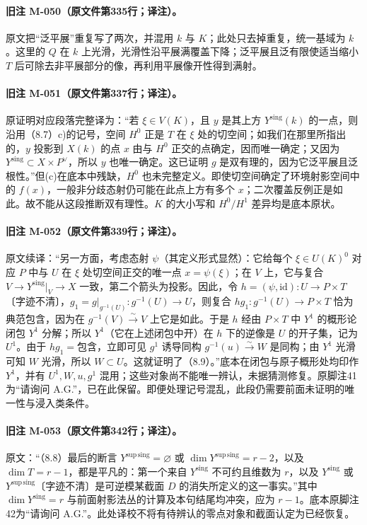 \documentclass[UTF8,a4paper]{ctexbook}
\begin{document}
\paragraph{旧注 M-050（原文件第335行；译注）。}
原文把“泛平展”重复写了两次，并混用 $k$ 与 $K$；此处只去掉重复，统一基域为 $k$。这里的 $Q$ 在 $k$ 上光滑，光滑性沿平展满覆盖下降；泛平展且泛有限使适当缩小 $T$ 后可除去非平展部分的像，再利用平展像开性得到满射。

\paragraph{旧注 M-051（原文件第337行；译注）。}
原证明对应段落完整译为：“若 $\xi\in V(K)$，且 $y$ 是其上方 ${Y^{\mathrm{sing}}}(k)$ 的一点，则沿用（8.7）c)的记号，空间 $H^0$ 正是 $T$ 在 $\xi$ 处的切空间；如我们在那里所指出的，$y$ 投影到 $X(k)$ 的点 $x$ 由与 $H^0$ 正交的点确定，因而唯一确定；又因为 ${Y^{\mathrm{sing}}}\subset X\times P^\vee$，所以 $y$ 也唯一确定。这已证明 $g$ 是双有理的，因为它泛平展且泛根性。”但(c)在底本中残缺，$H^0$ 也未完整定义。即使切空间确定了环境射影空间中的 $f(x)$，一般非分歧态射仍可能在此点上方有多个 $x$；二次覆盖反例正是如此。故不能从这段推断双有理性。$K$ 的大小写和 $H^0/H^1$ 差异均是底本原状。

\paragraph{旧注 M-052（原文件第339行；译注）。}
原文续译：“另一方面，考虑态射 $\psi$（其定义形式显然）：它给每个 $\xi\in U(K)^0$ 对应 $P$ 中与 $U$ 在 $\xi$ 处切空间正交的唯一点 $x=\psi(\xi)$；在 $V$ 上，它与复合 $V\to{Y^{\mathrm{sing}}}|_V\to X$ 一致，第二个箭头为投影。因此，令 $h=(\psi,\mathrm{id}):U\to P\times T$〔字迹不清〕，$g_1=g|_{g^{-1}(U)}:g^{-1}(U)\to U$，则复合 $hg_1:g^{-1}(U)\to P\times T$ 恰为典范包含，因为在 $g^{-1}(V)\xrightarrow{\sim}V$ 上它是如此。于是 $h$ 经由 $P\times T$ 中 $Y^1$ 的概形论闭包 $Y^1$ 分解；所以 $Y^1$（它在上述闭包中开）在 $h$ 下的逆像是 $U$ 的开子集，记为 $U^1$。由于 $hg_1=\text{包含}$，立即可见 $g^1$ 诱导同构 $g^{-1}(u)\xrightarrow{\sim}W$ 是同构；由 $Y^1$ 光滑可知 $W$ 光滑，所以 $W\subset U$。这就证明了（8.9）。”底本在闭包与原子概形处均印作 $Y^1$，并有 $U^1,W,u,g^1$ 混用；这些对象尚不能唯一辨认，未据猜测修复。原脚注41为“请询问 A.G.”，已在此保留。即便处理记号混乱，此段仍需要前面未证明的唯一性与浸入类条件。

\paragraph{旧注 M-053（原文件第342行；译注）。}
原文：“（8.8）最后的断言 ${Y^{\mathrm{sup\,sing}}}=\varnothing$ 或 $\dim{Y^{\mathrm{sup\,sing}}}=r-2$，以及 $\dim T=r-1$，都是平凡的：第一个来自 ${Y^{\mathrm{sing}}}$ 不可约且维数为 $r$，以及 ${Y^{\mathrm{sing}}}$ 或 ${Y^{\mathrm{sup\,sing}}}$〔字迹不清〕是可逆模某截面 $D$ 的消失所定义的这一事实。”其中 $\dim{Y^{\mathrm{sing}}}=r$ 与前面射影法丛的计算及本句结尾均冲突，应为 $r-1$。底本原脚注42为“请询问 A.G.”。此处译校不将有待辨认的零点对象和截面认定为已经恢复。
\end{document}
